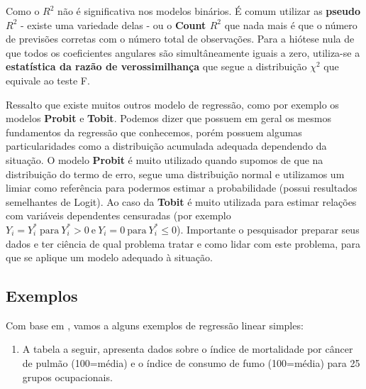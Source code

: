 \documentclass[
  openany]{book}
\providecommand{\tightlist}{%
  \setlength{\itemsep}{0pt}\setlength{\parskip}{0pt}}
\begin{document}
Como o \(R^2\) não é significativa nos modelos binários. É comum utilizar as \textbf{pseudo \(R^2\)} \citep{long1997regression} - existe uma variedade delas - ou o \textbf{Count \(R^2\)} que nada mais é que o número de previsões corretas com o número total de observações. Para a hiótese nula de que todos os coeficientes angulares são simultâneamente iguais a zero, utiliza-se a \textbf{estatística da razão de verossimilhança} que segue a distribuição \(\chi^2\) que equivale ao teste F.

Ressalto que existe muitos outros modelo de regressão, como por exemplo os modelos \textbf{Probit} e \textbf{Tobit}. Podemos dizer que possuem em geral os mesmos fundamentos da regressão que conhecemos, porém possuem algumas particularidades como a distribuição acumulada adequada dependendo da situação. O modelo \textbf{Probit} é muito utilizado quando supomos de que na distribuição do termo de erro, segue uma distribuição normal e utilizamos um limiar como referência para podermos estimar a probabilidade (possui resultados semelhantes de Logit). Ao caso da \textbf{Tobit} é muito utilizada para estimar relações com variáveis dependentes censuradas (por exemplo \(Y_i=Y_i^* \ \mbox{para} \ Y_i^* > 0 \ \mbox{e} \ Y_i=0 \ \mbox{para} \ Y_i^*\leq 0\)). Importante o pesquisador preparar seus dados e ter ciência de qual problema tratar e como lidar com este problema, para que se aplique um modelo adequado à situação.

\hypertarget{exemplo1reg}{%
\subsection{Exemplos}\label{exemplo1reg}}

Com base em \citet{morettin2017estatistica}, vamos a alguns exemplos de regressão linear simples:

\begin{enumerate}
\def\labelenumi{\arabic{enumi}.}
\tightlist
\item
  A tabela a seguir, apresenta dados sobre o índice de mortalidade por câncer de pulmão (100=média) e o índice de consumo de fumo (100=média) para 25 grupos ocupacionais.
\end{enumerate}
\end{document}
